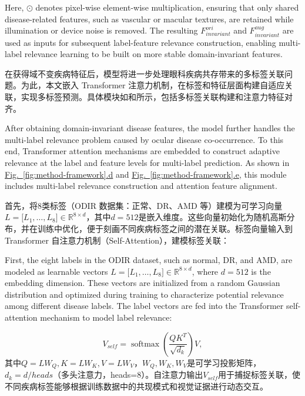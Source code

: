 Here, \(\odot\) denotes pixel-wise element-wise multiplication, ensuring that only shared disease-related features, such as vascular or macular textures, are retained while illumination or device noise is removed. The resulting \(F_{invariant}^{ori}\) and \(F_{invariant}^{aug}\) are used as inputs for subsequent label-feature relevance construction, enabling multi-label relevance learning to be built on more stable domain-invariant features.



在获得域不变疾病特征后，模型将进一步处理眼科疾病共存带来的多标签关联问题。为此，本文嵌入 Transformer 注意力机制，在标签和特征层面构建自适应关联，实现多标签预测。具体模块如和所示，包括多标签关联构建和注意力特征对齐。

After obtaining domain-invariant disease features, the model further handles the multi-label relevance problem caused by ocular disease co-occurrence. To this end, Transformer attention mechanisms are embedded to construct adaptive relevance at the label and feature levels for multi-label prediction. As shown in \hyperref[fig:method-framework]{Fig.~\ref*{fig:method-framework}.d} and \hyperref[fig:method-framework]{Fig.~\ref*{fig:method-framework}.e}, this module includes multi-label relevance construction and attention feature alignment.

首先，将8类标签（ODIR 数据集：正常、DR、AMD 等）建模为可学习向量\(L = \lbrack L_{1},\ldots,L_{8}\rbrack \in \mathbb{R}^{8 \times d}\)，其中\(d = 512\)是嵌入维度。这些向量初始化为随机高斯分布，并在训练中优化，便于刻画不同疾病标签之间的潜在关联。标签向量输入到 Transformer 自注意力机制（Self-Attention），建模标签关联：

First, the eight labels in the ODIR dataset, such as normal, DR, and AMD, are modeled as learnable vectors \(L = \lbrack L_{1},\ldots,L_{8}\rbrack \in \mathbb{R}^{8 \times d}\), where \(d = 512\) is the embedding dimension. These vectors are initialized from a random Gaussian distribution and optimized during training to characterize potential relevance among different disease labels. The label vectors are fed into the Transformer self-attention mechanism to model label relevance:

\begin{equation}\label{eq:self-attention}
V_{self} = \operatorname{softmax}\left(\frac{QK^{T}}{\sqrt{d_{k}}}\right)V,
\end{equation}
其中\(Q = LW_{Q},K = LW_{K},V = LW_{V}\)，\(W_{Q},W_{K},W_{V}\)是可学习投影矩阵，\(d_{k} = d/heads\)（多头注意力，heads=8）。自注意力输出\(V_{self}\)用于捕捉标签关联，使不同疾病标签能够根据训练数据中的共现模式和视觉证据进行动态交互。

